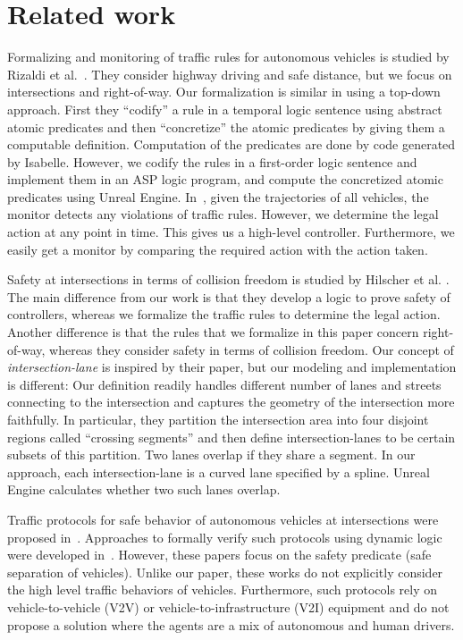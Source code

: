 \section{Related work}
Formalizing and monitoring of traffic rules for autonomous vehicles
is studied by Rizaldi et al.~\cite{Rizaldi.2017}.
They consider highway driving and safe distance,
but we focus on intersections and right-of-way.
Our formalization is similar in using a top-down approach.
First they ``codify'' a rule in a temporal logic sentence using abstract atomic predicates
and then ``concretize'' the atomic predicates by giving them a computable definition.
Computation of the predicates are done by code generated by Isabelle.
However,
we codify the rules in a first-order logic sentence and implement them in an ASP logic program,
and compute the concretized atomic predicates using Unreal Engine.
In~\cite{Rizaldi.2017},
given the trajectories
of all vehicles,
the monitor detects any violations of traffic rules.
However,
we determine the legal action at any point in time.
This gives us a high-level controller.
Furthermore,
we easily get a monitor by comparing the required action
with the action taken.


Safety at intersections in terms of collision freedom
is studied by Hilscher et al. \cite{Hilscher.2016}.
The main difference from our work is that they develop a logic to prove safety of controllers,
whereas we formalize the traffic rules to determine the legal action.
Another difference is that the rules that we formalize in this paper concern right-of-way,
whereas they consider safety in terms of collision freedom.
Our concept of \emph{intersection-lane} is inspired by their paper,
but our modeling and implementation is different:
Our definition readily handles different number of lanes and streets connecting to the intersection and captures the geometry of the intersection more faithfully.
In particular, they partition the intersection area into four disjoint regions called ``crossing segments'' and then define intersection-lanes to be certain subsets of this partition.
Two lanes overlap if they share a segment.
In our approach, each intersection-lane is a curved lane specified by a spline.
Unreal Engine calculates whether two such lanes overlap.

Traffic protocols for safe behavior of autonomous vehicles at intersections
were proposed in~\cite{azimi2011vehicular, hafner2013cooperative}.
Approaches to formally verify such protocols using dynamic logic
were developed in~\cite{loos2011safe}.
However,
these papers focus on the safety predicate (safe separation of vehicles).
Unlike our paper,
these works do not explicitly consider the high level traffic behaviors of vehicles.
Furthermore, such protocols rely on vehicle-to-vehicle (V2V) or vehicle-to-infrastructure (V2I) equipment and do not propose a solution where the agents are a mix of autonomous and human drivers. 


